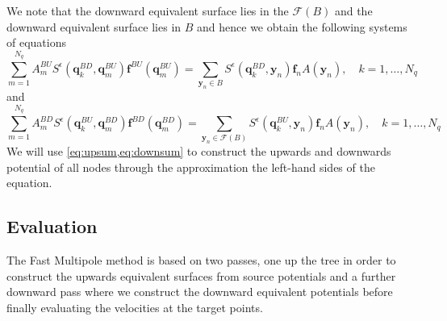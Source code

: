 We note that the downward equivalent surface lies in the $\mathcal{F}(B)$ and the downward equivalent surface lies in $B$ and hence we obtain the following systems of equations
\begin{equation}
\label{eq:upsum}
    \sum_{m=1}^{N_{q}} A_{m}^{BU} S^\epsilon\left(\bm{q}^{BD}_{k}, \bm{q}_{m}^{B U}\right) \bm{f}^{B U}\left(\bm{q}_{m}^{B U}\right)=\sum_{{\bm{y}}_{n} \in B} S^\epsilon\left(\bm{q}^{BD}_{k}, {\bm{y}}_{n}\right) {\bm{f}}_{n} A({\bm{y}}_n), \quad k=1,\dots,N_q
\end{equation}
and
\begin{equation}
\label{eq:downsum}
    \sum_{m=1}^{N_{q}} A_{m}^{BD} S^\epsilon\left(\bm{q}^{BU}_{k}, \bm{q}_{m}^{B D}\right) \bm{f}^{B D}\left(\bm{q}_{m}^{B D}\right)=\sum_{{\bm{y}}_{n} \in \mathcal{F}(B)} S^\epsilon\left(\bm{q}^{BU}_{k}, {\bm{y}}_{n}\right) {\bm{f}}_{n} A({\bm{y}}_n), \quad k=1,\dots,N_q
\end{equation}
We will use \cref{eq:upsum,eq:downsum} to construct the upwards and downwards potential of all nodes through the approximation the left-hand sides of the equation.

\subsection{Evaluation}
The Fast Multipole method is based on two passes, one up the tree in order to construct the upwards equivalent surfaces from source potentials and a further downward pass where we construct the downward equivalent potentials before finally evaluating the velocities at the target points.

